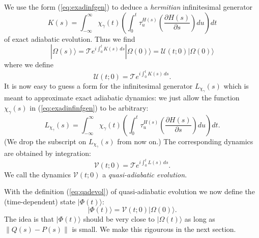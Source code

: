 \documentclass[twocolumn,lengthcheck,superscriptaddress]{revtex4-1}
\theoremstyle{definition}
\theoremstyle{remark}
\begin{document}
We use the form (\ref{eq:exadinfgen}) to deduce a \emph{hermitian}
infinitesimal generator
\begin{equation}\label{eq:exadinfinfgen}
K(s) = \int_{-\infty}^{\infty} \chi_{\gamma}(t)\left(\int_0^t
\tau_u^{H(s)}\left(\frac{\partial H(s)}{\partial s}\right) du\right)
dt
\end{equation}
of exact adiabatic evolution.  Thus we find
\begin{equation}
|\Omega(s)\rangle = \mathcal{T} e^{i\int^{t}_0 K(s) \,ds}
|\Omega(0)\rangle = \mathcal{U}(t;0)|\Omega(0)\rangle
\end{equation}
where we define
\begin{equation}\label{eq:adevol}
\mathcal{U}(t;0) = \mathcal{T} e^{i\int^{t}_0 K(s) \,ds}.
\end{equation}
It is now easy to guess a form for the infinitesimal generator
$L_{\chi_\gamma}(s)$ which is meant to approximate exact adiabatic
dynamics: we just allow the function $\chi_\gamma(s)$ in
(\ref{eq:exadinfinfgen}) to be arbitrary:
\begin{equation}\label{eq:exadinfinfgen2}
L_{\chi_\gamma}(s) = \int_{-\infty}^{\infty}
\chi_{\gamma}(t)\left(\int_0^t \tau_u^{H(s)}\left(\frac{\partial
H(s)}{\partial s}\right) du\right) dt.
\end{equation}
(We drop the subscript on $L_{\chi_\gamma}(s)$ from now on.) The
corresponding dynamics are obtained by integration:
\begin{equation}\label{eq:qadevol}
\mathcal{V}(t;0) = \mathcal{T} e^{i\int^{t}_0 L(s) \,ds}.
\end{equation}
We call the dynamics $\mathcal{V}(t;0)$ a \emph{quasi-adiabatic
evolution}.

With the definition (\ref{eq:qadevol}) of quasi-adiabatic evolution
we now define the (time-dependent) state $|\Phi(t)\rangle$:
\begin{equation}
|\Phi(t)\rangle = \mathcal{V}(t;0)|\Omega(0)\rangle.
\end{equation}
The idea is that $|\Phi(t)\rangle$ should be very close to
$|\Omega(t)\rangle$ as long as $\|Q(s)-P(s)\|$ is small. We make
this rigourous in the next section.
\end{document}
